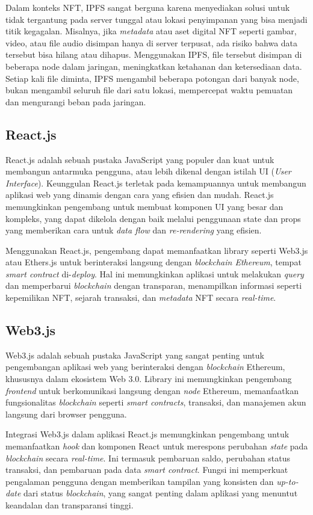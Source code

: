 Dalam konteks NFT, IPFS sangat berguna karena menyediakan solusi untuk tidak tergantung pada server tunggal atau lokasi penyimpanan yang bisa menjadi titik kegagalan. Misalnya, jika \emph{metadata} atau aset digital NFT seperti gambar, video, atau file audio disimpan hanya di server terpusat, ada risiko bahwa data tersebut bisa hilang atau dihapus. Menggunakan IPFS, file tersebut disimpan di beberapa node dalam jaringan, meningkatkan ketahanan dan ketersediaan data. Setiap kali file diminta, IPFS mengambil beberapa potongan dari banyak node, bukan mengambil seluruh file dari satu lokasi, mempercepat waktu pemuatan dan mengurangi beban pada jaringan.

\subsection{React.js}
React.js adalah sebuah pustaka JavaScript yang populer dan kuat untuk membangun antarmuka pengguna, atau lebih dikenal dengan istilah UI (\emph{User Interface}). Keunggulan React.js terletak pada kemampuannya untuk membangun aplikasi web yang dinamis dengan cara yang efisien dan mudah. React.js memungkinkan pengembang untuk membuat komponen UI yang besar dan kompleks, yang dapat dikelola dengan baik melalui penggunaan state dan props yang memberikan cara untuk \emph{data flow} dan \emph{re-rendering} yang efisien. 

Menggunakan React.js, pengembang dapat memanfaatkan library seperti Web3.js atau Ethers.js untuk berinteraksi langsung dengan \emph{blockchain Ethereum}, tempat \emph{smart contract} di-\emph{deploy}. Hal ini memungkinkan aplikasi untuk melakukan \emph{query} dan memperbarui \emph{blockchain} dengan transparan, menampilkan informasi seperti kepemilikan NFT, sejarah transaksi, dan \emph{metadata} NFT secara \emph{real-time}. 

\subsection{Web3.js}
Web3.js adalah sebuah pustaka JavaScript yang sangat penting untuk pengembangan aplikasi web yang berinteraksi dengan \emph{blockchain} Ethereum, khususnya dalam ekosistem Web 3.0. Library ini memungkinkan pengembang \emph{frontend} untuk berkomunikasi langsung dengan \emph{node} Ethereum, memanfaatkan fungsionalitas \emph{blockchain} seperti \emph{smart contracts}, transaksi, dan manajemen akun langsung dari browser pengguna.

Integrasi Web3.js dalam aplikasi React.js memungkinkan pengembang untuk memanfaatkan \emph{hook} dan komponen React untuk merespons perubahan \emph{state} pada \emph{blockchain} secara \emph{real-time}. Ini termasuk pembaruan saldo, perubahan status transaksi, dan pembaruan pada data \emph{smart contract}. Fungsi ini memperkuat pengalaman pengguna dengan memberikan tampilan yang konsisten dan \emph{up-to-date} dari status \emph{blockchain}, yang sangat penting dalam aplikasi yang menuntut keandalan dan transparansi tinggi.

